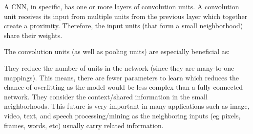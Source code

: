 \documentclass[a4paper]{article}
\begin{document}
A CNN, in specific, has one or more layers of convolution units. A convolution unit receives its input from multiple units from the previous layer which together create a proximity. Therefore, the input units (that form a small neighborhood) share their weights.

The convolution units (as well as pooling units) are especially beneficial as:

They reduce the number of units in the network (since they are many-to-one mappings). This means, there are fewer parameters to learn which reduces the chance of overfitting as the model would be less complex than a fully connected network.
They consider the context/shared information in the small neighborhoods. This future is very important in many applications such as image, video, text, and speech processing/mining as the neighboring inputs (eg pixels, frames, words, etc) usually carry related information.
\end{document}
